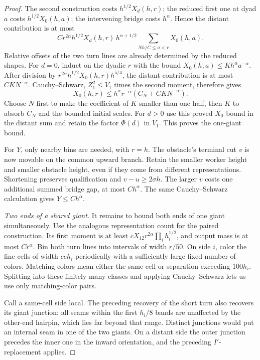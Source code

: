 \begin{proof}
The second construction costs \(h^{1/2}X_d(h,r)\); the reduced first
one at dyad \(a\) costs \(h^{1/2}X_0(h,a)\); the intervening bridge costs
\(h^\alpha\). Hence the distant contribution is at most
\[
 Cr^{2\alpha}h^{1/2}X_d(h,r)\,
 h^{\alpha+1/2}\sum_{Nh/C\le a<r}X_0(h,a).
\]
Relative offsets of the two turn lines are already determined by the
reduced shapes. For \(d=0\), induct on the dyadic \(r\) with the bound
\(X_0(h,a)\le Kh^\alpha a^{-\alpha}\). After division by
\(r^{2\alpha}h^{1/2}X_0(h,r)h^{5/4}\), the distant contribution is at
most \(CKN^{-\alpha}\). Cauchy--Schwarz, \(Z_1^2\le V_1\) times the
second moment, therefore gives
\[
 X_0(h,r)\le h^\alpha r^{-\alpha}(C_N+CKN^{-\alpha}).
\]
Choose \(N\) first to make the coefficient of \(K\) smaller than one
half, then \(K\) to absorb \(C_N\) and the bounded initial scales. For
\(d>0\) use this proved \(X_0\) bound in the distant sum and retain the
factor \(\Phi(d)\) in \(V_1\). This proves the one-giant bound.

For \(Y\), only nearby bins are needed, with \(r=h\). The obstacle's
terminal cut \(v\) is now movable on the common upward branch. Retain
the smaller worker height and smaller obstacle height, even if they
come from different representations. Shortening preserves
qualification and \(v-u\ge2\sigma h\). The larger \(v\) costs one
additional summed bridge gap, at most \(Ch^\alpha\). The same
Cauchy--Schwarz calculation gives \(Y\le Ch^\alpha\).

\smallskip\noindent\emph{Two ends of a shared giant.}
It remains to bound both ends of one giant simultaneously. Use the
analogous representation count for the paired construction. Its first
moment is at least
\(cX_{12}r^{2\alpha}\prod_i h_i^{1/2}\), and output mass is at most
\(Cr^\alpha\). Bin both turn lines into intervals of width \(r/50\).
On side \(i\), color the fine cells of width \(ceh_i\) periodically with
a sufficiently large fixed number of colors. Matching colors mean either
the same cell or separation exceeding \(100h_i\). Splitting into these
finitely many classes and applying Cauchy--Schwarz lets us use only
matching-color pairs.

Call a same-cell side local. The preceding recovery of the short turn
also recovers its giant junction: all seams within the first \(h_i/8\)
bands are unaffected by the other-end hairpin, which lies far beyond
that range. Distinct junctions would put an internal seam in one of the
two giants. On a distant side the outer junction precedes the inner one
in the inward orientation, and the preceding \(I'\)-replacement applies.


\end{proof}

